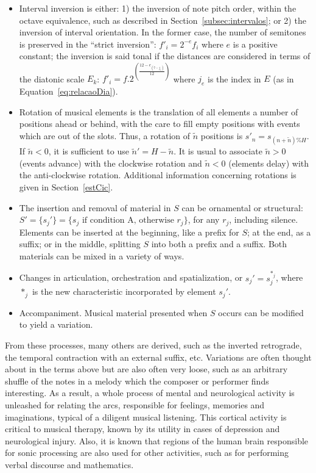 \begin{itemize}
        \item Interval inversion is either: 1) the inversion of note pitch order, within the octave equivalence,
            such as described in Section~\ref{subsec:intervalos};
            or 2) the inversion of interval orientation. In the former case, the number of semitones
        is preserved in the ``strict inversion'': $f'_i = 2^{-e} f_i$ where $e$ is a positive constant;
        the inversion is said tonal if the distances are
        considered in terms of the diatonic scale $E_k$:
        $f'_i = f.2^{\left(\frac{12-e_{\left(7-j_e\right)}}{12}\right)}$
        where $j_e$ is the index in $E$ (as in Equation~\ref{eq:relacaoDia}).

        \item Rotation of musical elements is the translation of all elements
        a number of positions ahead or behind, with the care to fill empty positions
        with events which are out of the slots. Thus, a
        rotation of $\tilde{n}$ positions is $s'_n=s_{(n+\tilde{n})\%H}$. If
        $\tilde{n}<0$, it is sufficient to use $\tilde{n}'=H-\tilde{n}$. It is
        usual to associate $\tilde{n}>0$ (events advance) with the clockwise rotation and
        $\tilde{n}<0$ (elements delay) with the anti-clockwise rotation.
        Additional information concerning rotations is given in Section~\ref{estCic}.

        \item The insertion and removal of material in $S$ can be
    ornamental or structural: $S'=\{s_j'\}=\{s_j \text{ if condition A,
    otherwise } r_j\}$, for any $r_j$, including silence.
    Elements can be inserted at the beginning, like a prefix
    for $S$; at the end, as a suffix; or in the middle, splitting $S$ into both
    a prefix and a suffix. Both materials can be mixed in a variety of ways.

    \item Changes in articulation, orchestration and spatialization, or
    $s_j'=s_j^{*_j}$, where $*_j$ is the new characteristic incorporated by 
    element $s_j'$.
    
    \item Accompaniment.
        Musical material presented when $S$ occurs can be modified to yield a variation.
\end{itemize}

From these processes, many others are derived, such as the inverted retrograde, the temporal contraction with an external suffix, etc.
Variations are often thought about in the terms above but are also often very loose,
such as an arbitrary shuffle of the notes in a melody which the composer or performer finds interesting.
As a result, a whole process of mental and neurological activity is unleashed for relating the arcs, responsible for feelings, memories and imaginations, typical of a diligent musical listening.
This cortical activity is critical to
musical therapy, known by its utility in cases of depression and neurological injury.
Also, it is known that regions of the human brain responsible for sonic processing are also used for other activities,
such as for performing verbal discourse and mathematics.~\cite{Sacks,Roederer}

